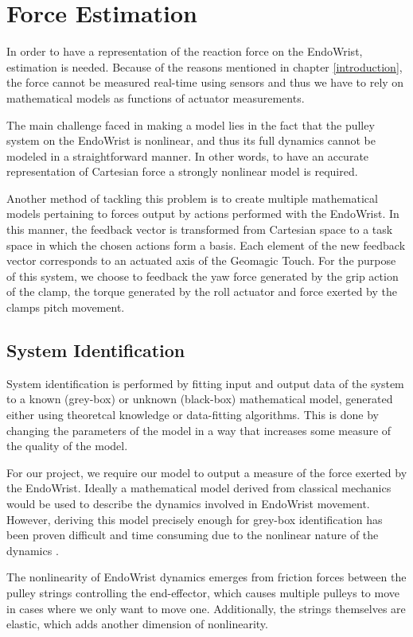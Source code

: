 \chapter{Force Estimation}
In order to have a representation of the reaction force on the EndoWrist, estimation is needed.
Because of the reasons mentioned in chapter \ref{introduction}, the force cannot be measured real-time using sensors and thus we have to rely on mathematical models as functions of actuator measurements.

The main challenge faced in making a model lies in the fact that the pulley system on the EndoWrist is nonlinear, and thus its full dynamics cannot be modeled in a straightforward manner. 
In other words, to have an accurate representation of Cartesian force a strongly nonlinear model is required.

Another method of tackling this problem is to create multiple mathematical models pertaining to forces output by actions performed with the EndoWrist.
In this manner, the feedback vector is transformed from Cartesian space to a task space in which the chosen actions form a basis.
Each element of the new feedback vector corresponds to an actuated axis of the Geomagic Touch.
For the purpose of this system, we choose to feedback the yaw force generated by the grip action of the clamp, the torque generated by the roll actuator and force exerted by the clamps pitch movement.

\section{System Identification}
System identification is performed by fitting input and output data of the system to a known (grey-box) or unknown (black-box) mathematical model, generated either using theoretcal knowledge or data-fitting algorithms. 
This is done by changing the parameters of the model in a way that increases some measure of the quality of the model.

For our project, we require our model to output a measure of the force exerted by the EndoWrist.
Ideally a mathematical model derived from classical mechanics would be used to describe the dynamics involved in EndoWrist movement.
However, deriving this model precisely enough for grey-box identification has been proven difficult and time consuming due to the nonlinear nature of the dynamics \cite{kim2014dynamic}.

The nonlinearity of EndoWrist dynamics emerges from friction forces between the pulley strings controlling the end-effector, which causes multiple pulleys to move in cases where we only want to move one. 
Additionally, the strings themselves are elastic, which adds another dimension of nonlinearity.

